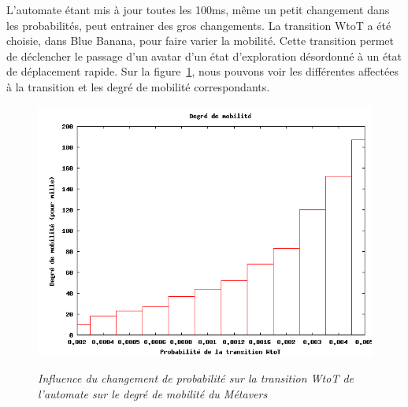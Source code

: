 \par L'automate étant mis à jour toutes les 100ms, même un petit changement dans les probabilités, peut entrainer des gros changements. La transition WtoT a été choisie, dans Blue Banana, pour faire varier la mobilité. Cette transition permet de déclencher le passage d'un avatar d'un état d'exploration désordonné à un état de déplacement rapide. Sur la figure~\ref{fig:mobility}, nous pouvons voir les différentes affectées à la transition et les degré de mobilité correspondants. 

\begin{figure}
  \begin{center}
    \includegraphics[scale=0.55]{./Ressources/Images/mobility.png} \\
    \caption{\textit{\small Influence du changement de probabilité sur
        la transition WtoT de l'automate sur le degré de mobilité du
        Métavers}}
    \label{fig:mobility}
  \end{center}
\end{figure}


